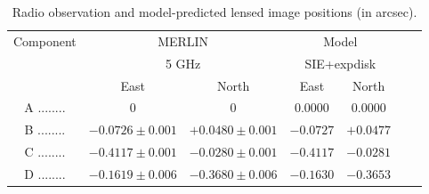 \documentclass[useAMS,usenatbib]{mn2e}
\begin{document}

\begin{table}
\centering
 \begin{minipage}{140mm}
  \caption{Radio observation \citep{Marlow99} and model-predicted lensed image positions (in arcsec).}
  \begin{tabular}{@{}ccccccc}
\hline

Component	&\multicolumn{2}{c}{MERLIN} 	 & \multicolumn{2}{c}{Model} \\
					&\multicolumn{2}{c}{5 GHz}		&	\multicolumn{2}{c}{SIE+expdisk} 	\\
					 &East &North &East 		&North \\ 
\hline
A ........ &$0$    		&$0$		&$0.0000$ &$0.0000$   \\  
B ........ &$-0.0726\pm 0.001$ 	&$+0.0480 \pm 0.001$	&$-0.0727$ &$+0.0477$  \\  
C ........ &$-0.4117\pm 0.001$  &$-0.0280 \pm 0.001$	&$-0.4117$ &$-0.0281$   \\  
D ........ &$-0.1619\pm 0.006$  &$-0.3680\pm 0.006$	&$-0.1630$ &$-0.3653$  \\  
\hline
\end{tabular}

\end{minipage}
\medskip
\end{table}

\end{document}
